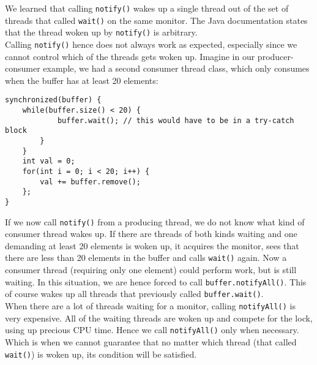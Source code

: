 \documentclass[main.tex]{subfiles}
\begin{document}
We learned that calling \texttt{notify()} wakes up a single thread out of the set of threads that called \texttt{wait()} on the same monitor.  The Java documentation states that the thread woken up by \texttt{notify()} is arbitrary.\\
Calling \texttt{notify()} hence does not always work as expected, especially since we cannot control which of the threads gets woken up. Imagine in our producer-consumer example, we had a second consumer thread class, which only consumes when the buffer has at least 20 elements:
\begin{verbatim}
synchronized(buffer) {
    while(buffer.size() < 20) {
            buffer.wait(); // this would have to be in a try-catch block
        }
    }
    int val = 0;
    for(int i = 0; i < 20; i++) {
        val += buffer.remove();
    };
}
\end{verbatim}
If we now call \texttt{notify()} from a producing thread, we do not know what kind of consumer thread wakes up. If there are threads of both kinds waiting and one demanding at least 20 elements is woken up, it acquires the monitor, sees that there are less than 20 elements in the buffer and calls \texttt{wait()} again. Now a consumer thread (requiring only one element) could perform work, but is still waiting. In this situation, we are hence forced to call \texttt{buffer.notifyAll()}. This of course wakes up all threads that previously called \texttt{buffer.wait()}.\\
When there are a lot of threads waiting for a monitor, calling \texttt{notifyAll()} is very expensive. All of the waiting threads are woken up and compete for the lock, using up precious CPU time. Hence we call \texttt{notifyAll()} only when necessary. Which is when we cannot guarantee that no matter which thread (that called \texttt{wait()}) is woken up, its condition will be satisfied.
\end{document}
